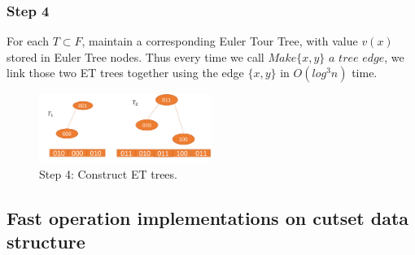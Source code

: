 \documentclass[conference,compsoc]{IEEEtran}
\begin{document}
\subsubsection*{Step 4} For each $T \subset F$, maintain a corresponding Euler Tour Tree, with value $v(x)$ stored in Euler Tree nodes. Thus every time we call $Make\{x,y\}$ $a$ $tree$ $edge$, we link those two ET trees together using the edge $\{x,y\}$ in $O(log^3n)$ time.
\begin{figure}[h]
	\centering
	\includegraphics[width=0.5\textwidth]{Pic/4.png}
	\caption{Step 4: Construct ET trees.}
	\label{fig:4}
\end{figure}
\subsection{Fast operation implementations on cutset data structure}
\end{document}
